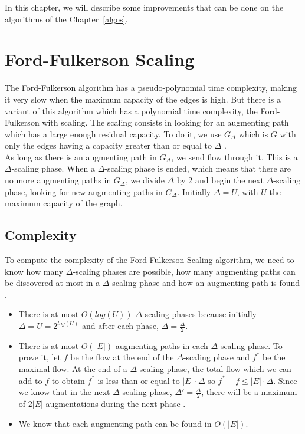 
In this chapter, we will describe some improvements that can be done on the algorithms of the Chapter~\ref{algos}.

\section{Ford-Fulkerson Scaling}
The Ford-Fulkerson algorithm has a pseudo-polynomial time complexity, making it very slow when the maximum capacity of the edges is high. But there is a variant of this algorithm which has a polynomial time complexity, the Ford-Fulkerson with scaling. The scaling consists in looking for an augmenting path which has a large enough residual capacity. To do it, we use $G_\Delta$ which is $G$ with only the edges having a capacity greater than or equal to $\Delta$ \cite{lectu5}. \\

As long as there is an augmenting path in $G_\Delta$, we send flow through it. This is a $\Delta$-scaling phase. When a $\Delta$-scaling phase is ended, which means that there are no more augmenting paths in $G_\Delta$, we divide $\Delta$ by 2 and begin the next $\Delta$-scaling phase, looking for new augmenting paths in $G_\Delta$. Initially $\Delta = U$, with $U$ the maximum capacity of the graph.

\subsection{Complexity}
To compute the complexity of the Ford-Fulkerson Scaling algorithm, we need to know how many $\Delta$-scaling phases are possible, how many augmenting paths can be discovered at most in a $\Delta$-scaling phase and how an augmenting path is found \cite{lectu7}.

\begin{itemize}
\item There is at most $O(log(U))$ $\Delta$-scaling phases because initially $\Delta = U = 2^{log(U)}$ and after each phase, $\Delta=\frac{\Delta}{2}$.
\item There is at most $O(|E|)$ augmenting paths in each $\Delta$-scaling phase. To prove it, let $f$ be the flow at the end of the $\Delta$-scaling phase and $f^*$ be the maximal flow. At the end of a $\Delta$-scaling phase, the total flow which we can add to $f$ to obtain $f^*$ is less than or equal to $|E| \cdot \Delta$ so $f^*-f \leq |E| \cdot \Delta$. Since we know that in the next $\Delta$-scaling phase, $\Delta'=\frac{\Delta}{2}$, there will be a maximum of $2|E|$ augmentations during the next phase \cite{lectu5}.
\item We know that each augmenting path can be found in $O(|E|)$.
\end{itemize}

